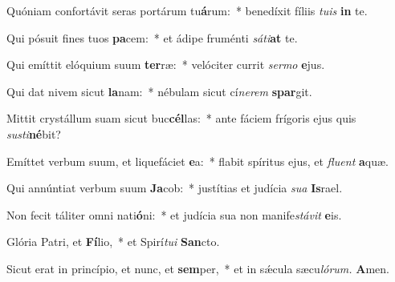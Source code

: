 \item Quóniam confortávit seras portárum tu\textbf{á}rum:~* benedíxit fíliis \textit{tuis} \textbf{in} te.
\item Qui pósuit fines tuos \textbf{pa}cem:~* et ádipe fruménti \textit{sáti}\textbf{at} te.
\item Qui emíttit elóquium suum \textbf{ter}ræ:~* velóciter currit \textit{sermo} \textbf{e}jus.
\item Qui dat nivem sicut \textbf{la}nam:~* nébulam sicut cí\hspace{0.03em}\textit{nerem} \textbf{spar}git.
\item Mittit crystállum suam sicut buc\textbf{cél}las:~* ante fáciem frígoris ejus quis \textit{sus\-ti}\textbf{né}bit?
\item Emíttet verbum suum, et liquefáciet \textbf{e}a:~* flabit spíritus ejus, et \textit{fluent} \textbf{a}quæ.
\item Qui annúntiat verbum suum \textbf{Ja}cob:~* justítias et judícia \textit{sua} \textbf{Is}rael.
\item Non fecit táliter omni nati\textbf{ó}ni:~* et judícia sua non manife\hspace{0.03em}\textit{stávit} \textbf{e}is.
\item Glória Patri, et \textbf{Fí}lio,~* et Spirí\hspace{0.03em}\textit{tui} \textbf{San}cto.
\item Sicut erat in princípio, et nunc, et \textbf{sem}per,~* et in sǽcula sæcu\hspace{0.03em}\textit{lórum.} \textbf{A}men.